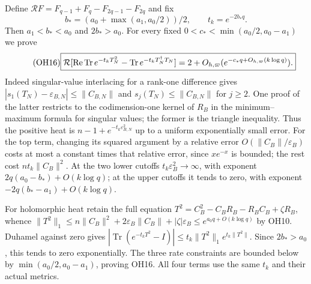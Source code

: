 \documentclass[11pt]{article}
\newcommand{\Tr}{\operatorname{Tr}}\newcommand{\diag}{\operatorname{diag}}
\newcommand{\eps}{\varepsilon}
\begin{document}
Define $\mathcal RF=F_{q-1}+F_q-F_{2q-1}-F_{2q}$ and fix
\begin{equation}\tag{OH15}
 b_*=(a_0+\max(a_1,a_0/2))/2,\qquad t_k=e^{-2b_*q}.
\end{equation}
Then $a_1<b_*<a_0$ and $2b_*>a_0$. For every fixed
$0<c_*<\min(a_0/2,a_0-a_1)$ we prove
\begin{equation}\tag{OH16}\boxed{
 \mathcal R[\Rea\Tr e^{-t_kT_N^2}
             -\Tr e^{-t_kT_N^\dagger T_N}]
 =2+O_{h,\varpi}(e^{-c_*q+O_{h,\varpi}(k\log q)}).}
\end{equation}
Indeed singular-value interlacing for a rank-one difference gives
$|s_1(T_N)-\eps_{B,N}|\le\|C_{B,N}\|$ and
$s_j(T_N)\le\|C_{B,N}\|$ for $j\ge2$. One proof of the latter
restricts to the codimension-one kernel of $R_B$ in the minimum--maximum
formula for singular values; the former is the triangle inequality.
Thus the positive heat is
$n-1+e^{-t_k\eps_{B,N}^2}$ up to a uniform exponentially small error.
For the top term, changing its squared argument by a relative error
$O(\|C_B\|/\eps_B)$ costs at most a constant times that relative
error, since $xe^{-x}$ is bounded; the rest cost $nt_k\|C_B\|^2$.
At the two lower cutoffs $t_k\eps_B^2\to\infty$, with exponent
$2q(a_0-b_*)+O(k\log q)$; at the upper cutoffs it tends to zero,
with exponent $-2q(b_*-a_1)+O(k\log q)$.

For holomorphic heat retain the full equation
$T^2=C_B^2-C_BR_B-R_BC_B+\zeta R_B$, whence
$\|T^2\|_1\le n\|C_B\|^2+2\eps_B\|C_B\|+|\zeta|\eps_B
\le e^{a_0q+O(k\log q)}$ by OH10.
Duhamel against zero gives
$|\Tr(e^{-t_kT^2}-I)|\le t_k\|T^2\|_1e^{t_k\|T^2\|}$.
Since $2b_*>a_0$, this tends to zero exponentially. The three rate
constraints are bounded below by $\min(a_0/2,a_0-a_1)$, proving
OH16. All four terms use the same $t_k$ and their actual metrics.
\end{document}
